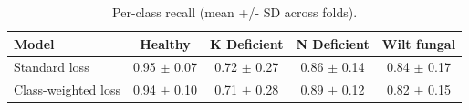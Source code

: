 \begin{table}[t]
\centering
\caption{Per-class recall (mean +/- SD across folds).}
\label{tab:vision-recall}
\begin{tabular}{lcccc}
\toprule
Model & Healthy & K Deficient & N Deficient & Wilt fungal \\
\midrule
Standard loss & 0.95 $\pm$ 0.07 & 0.72 $\pm$ 0.27 & 0.86 $\pm$ 0.14 & 0.84 $\pm$ 0.17 \\
Class-weighted loss & 0.94 $\pm$ 0.10 & 0.71 $\pm$ 0.28 & 0.89 $\pm$ 0.12 & 0.82 $\pm$ 0.15 \\
\bottomrule
\end{tabular}
\end{table}